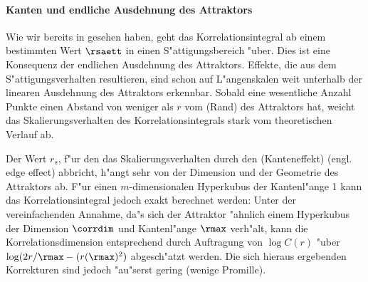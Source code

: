 \paragraph{Kanten und endliche Ausdehnung des Attraktors}
Wie wir bereits in  gesehen haben, geht das Korrelationsintegral ab einem
bestimmten Wert $\rsaett$ in einen S"attigungsbereich "uber. Dies ist eine Konsequenz der
endlichen Ausdehnung des Attraktors. Effekte, die aus dem S"attigungsverhalten resultieren, 
sind schon auf L"angen\-skalen weit unterhalb der linearen Ausdehnung des Attraktors
erkennbar. Sobald eine wesentliche Anzahl Punkte einen Abstand von weniger als $r$ vom
\naja(Rand) des Attraktors hat, weicht das Skalierungsverhalten des Korrelationsintegrals
stark vom theoretischen Verlauf ab.

Der Wert $r_s$, f"ur den das Skalierungsverhalten durch den \begriff(Kanteneffekt)
(engl. edge effect) abbricht, h"angt sehr von
der Dimension und der Geometrie des Attraktors ab. 
F"ur einen $m$-dimensionalen Hyperkubus der Kantenl"ange 1 kann das 
Korrelationsintegral jedoch exakt berechnet werden\footnotemark:
Unter der vereinfachenden Annahme, da"s sich der Attraktor "ahnlich einem Hyperkubus
der Dimension $\corrdim$ und Kantenl"ange $\rmax$ verh"alt, kann die Korrelationsdimension entsprechend
 durch Auftragung von $\log C(r)$ "uber $\log(2r/\rmax-(r(\rmax)^2)$
abgesch"atzt werden. Die sich hieraus ergebenden Korrekturen  
sind jedoch "au"serst gering (wenige Promille).

